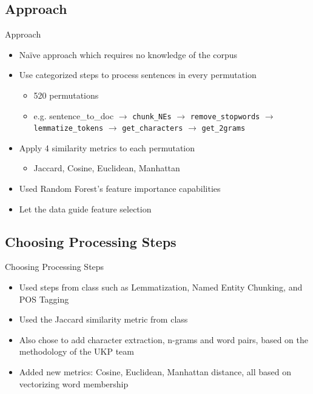 \documentclass{beamer}
\begin{document}
\subsection{Approach}
\begin{frame}{Approach}
    \begin{itemize}
        \item Naïve approach which requires no knowledge of the corpus
        \item Use categorized steps to process sentences in every permutation
        \begin{itemize}
            \item 520 permutations
            \item e.g. sentence\_to\_doc $\rightarrow$ \texttt{chunk\_NEs} $\rightarrow$ \texttt{remove\_stopwords} $\rightarrow$ \texttt{lemmatize\_tokens} $\rightarrow$ \texttt{get\_characters} $\rightarrow$ \texttt{get\_2grams}
        \end{itemize}
        \item Apply 4 similarity metrics to each permutation
        \begin{itemize}
            \item Jaccard, Cosine, Euclidean, Manhattan
        \end{itemize}
        \item Used Random Forest's feature importance capabilities
        \item Let the data guide feature selection
    \end{itemize}

\end{frame}

\subsection{Choosing Processing Steps}
\begin{frame}{Choosing Processing Steps}
    \begin{itemize}
        \item Used steps from class such as Lemmatization, Named Entity Chunking, and POS Tagging
        \item Used the Jaccard similarity metric from class
        \item Also chose to add character extraction, n-grams and word pairs, based on the methodology of the UKP team \cite{10.5555/2387636.2387707}
        \item Added new metrics: Cosine, Euclidean, Manhattan distance, all based on vectorizing word membership
    \end{itemize}
\end{frame}
\end{document}
